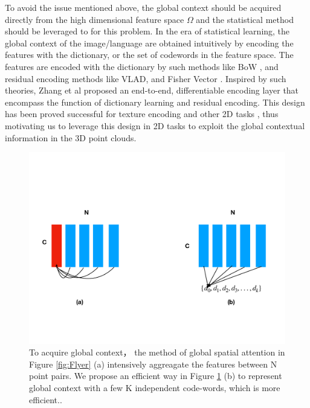 \documentclass[runningheads]{llncs}
\begin{document}
 To avoid the issue mentioned above, the global context should be acquired directly from the high dimensional feature space $\Omega$ and the statistical method should be leveraged to for this problem. In the era of statistical learning, the global context of the image/language are obtained intuitively by encoding the features with the dictionary, or the set of  codewords in the feature space. The features are encoded with the dictionary by such methods like BoW \cite{BoW1,BoW2,BoW3,BoW4}, and residual encoding methods like VLAD\cite{VLAD}, and Fisher Vector \cite{FisherVector1,FisherVector2}.  Inspired by such theories, Zhang et al proposed an end-to-end,  differentiable encoding layer \cite{DeepTEN} that encompass the function of dictionary learning and  residual encoding. This design has been proved successful for texture encoding \cite{DeepTEN} and other 2D tasks  \cite{encnet,pascal,ImageNet}, thus  motivating us to leverage this design in 2D tasks to exploit the global contextual information in the 3D point clouds.
 
\begin{figure}[t]
\label{fig:Flyer}
			\begin{minipage}{1\textwidth}
				\centering
				\includegraphics[width=1.0\linewidth]{eccv2020kit/Figure/Flyer.pdf}
			\end{minipage}
    \caption{To acquire global context， the method of global spatial attention in Figure \ref{fig:Flyer} (a) intensively aggreagate the features between N point pairs. We propose an efficient  way in Figure \ref{fig:flyer} (b) to represent  global context  with  a few K independent code-words, which is more efficient..  }%
\label{fig:flyer}
    
\end{figure}
 
\end{document}
